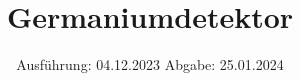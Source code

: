 

\subject{V18}
\title{Germaniumdetektor}
\date{%
  Ausführung: 04.12.2023
  \hspace{3em}
  Abgabe: 25.01.2024
}



\maketitle
\setcounter{page}{1}



\newpage




\printbibliography{}


